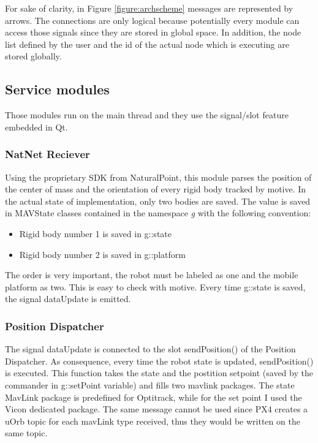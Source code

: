 \noindent
For sake of clarity, in Figure \ref{figure:archscheme} messages are represented by arrows. The connections are only logical because potentially every module can access those signals since they are stored in global space. In addition, the node list defined by the user and the id of the actual node which is executing are stored globally.

\subsection{Service modules}

Those modules run on the main thread and they use the signal/slot feature embedded in Qt. 

\subsubsection*{NatNet Reciever}

Using the proprietary SDK from NaturalPoint, this module parses the position of the center of mass and the orientation of every rigid body tracked by motive. In the actual state of implementation, only two bodies are saved. The value is saved in MAVState classes contained in the  namespace \textit{g} with the following convention: \begin{itemize}
\item Rigid body number 1 is saved in g::state 
\item Rigid body number 2 is saved in g::platform
\end{itemize}
The order is very important, the robot must be labeled as one and the mobile platform as two. This is easy to check with motive. Every time g::state is saved, the signal dataUpdate is emitted.
\subsubsection*{Position Dispatcher}

The signal dataUpdate is connected to the slot sendPosition() of the Position Dispatcher. As consequence, every time the robot state is updated, sendPosition() is executed. This function takes the state and the postition setpoint (saved by the commander in g::setPoint variable) and fills two mavlink packages. The state MavLink package is predefined for Optitrack, while for the set point I used the Vicon dedicated package. The same message cannot be used since PX4 creates a uOrb topic for each mavLink type received, thus they would be written on the same topic. 

